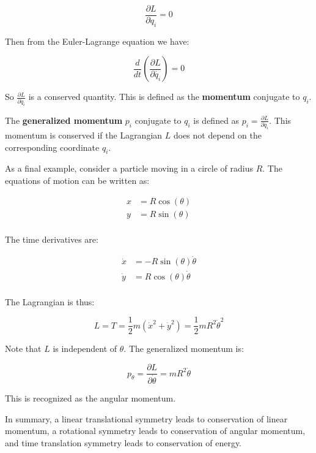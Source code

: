 \begin{equation}
    \frac{\partial L}{\partial q_i} = 0
\end{equation}

Then from the Euler-Lagrange equation we have:

\begin{equation}
    \frac{d}{dt} \left(\frac{\partial L}{\partial \dot{q_i}}\right) = 0
\end{equation}

So $\frac{\partial L}{\partial \dot{q_i}}$ is a conserved quantity. This is defined as 
the \textbf{momentum} conjugate to $q_i$.

\begin{definition}
    The \textbf{generalized momentum} $p_i$ conjugate to $q_i$ is defined as $p_i = \frac{\partial L}{\partial \dot{q_i}}$.
    This momentum is conserved if the Lagrangian $L$ does not depend on the corresponding coordinate $q_i$.
\end{definition}

As a final example, consider a particle moving in a circle of radius $R$. The equations 
of motion can be written as:

\begin{align*}
    x&=R\cos(\theta)\\
    y&=R\sin(\theta)\\
\end{align*}

The time derivatives are:

\begin{align*}
    \dot{x}&=-R\sin(\theta)\dot{\theta}\\
    \dot{y}&=R\cos(\theta)\dot{\theta}\\
\end{align*}

The Lagrangian is thus:

\begin{equation}
    L = T = \frac{1}{2} m (\dot{x}^2+\dot{y}^2) = \frac{1}{2} m R^2 \dot{\theta}^2
\end{equation}

Note that $L$ is independent of $\theta$. The generalized momentum is:

\begin{equation}
    p_\theta =  \frac{\partial L}{\partial\dot{\theta}} = m R^2 \dot{\theta}
\end{equation}

This is recognized as the angular momentum.

In summary, a linear translational symmetry leads to conservation of linear momentum, a 
rotational symmetry leads to conservation of angular momentum, and time translation 
symmetry leads to conservation of energy.